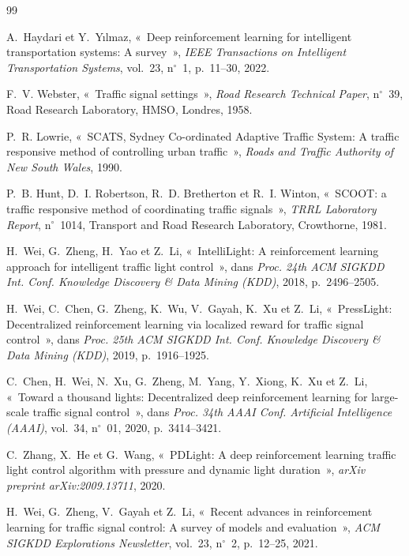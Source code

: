 \documentclass[11pt,a4paper]{article}
\begin{document}
\begin{thebibliography}{99}
\setlength{\itemsep}{0.25em}

A.~Haydari et Y.~Y{\i}lmaz, «~Deep reinforcement learning for intelligent transportation systems: A survey~», \emph{IEEE Transactions on Intelligent Transportation Systems}, vol.~23, n$^\circ$~1, p.~11--30, 2022.

F.~V. Webster, «~Traffic signal settings~», \emph{Road Research Technical Paper}, n$^\circ$~39, Road Research Laboratory, HMSO, Londres, 1958.

P.~R. Lowrie, «~SCATS, Sydney Co-ordinated Adaptive Traffic System: A traffic responsive method of controlling urban traffic~», \emph{Roads and Traffic Authority of New South Wales}, 1990.

P.~B. Hunt, D.~I. Robertson, R.~D. Bretherton et R.~I. Winton, «~SCOOT: a traffic responsive method of coordinating traffic signals~», \emph{TRRL Laboratory Report}, n$^\circ$~1014, Transport and Road Research Laboratory, Crowthorne, 1981.

H.~Wei, G.~Zheng, H.~Yao et Z.~Li, «~IntelliLight: A reinforcement learning approach for intelligent traffic light control~», dans \emph{Proc. 24th ACM SIGKDD Int. Conf. Knowledge Discovery \& Data Mining (KDD)}, 2018, p.~2496--2505.

H.~Wei, C.~Chen, G.~Zheng, K.~Wu, V.~Gayah, K.~Xu et Z.~Li, «~PressLight: Decentralized reinforcement learning via localized reward for traffic signal control~», dans \emph{Proc. 25th ACM SIGKDD Int. Conf. Knowledge Discovery \& Data Mining (KDD)}, 2019, p.~1916--1925.

C.~Chen, H.~Wei, N.~Xu, G.~Zheng, M.~Yang, Y.~Xiong, K.~Xu et Z.~Li, «~Toward a thousand lights: Decentralized deep reinforcement learning for large-scale traffic signal control~», dans \emph{Proc. 34th AAAI Conf. Artificial Intelligence (AAAI)}, vol.~34, n$^\circ$~01, 2020, p.~3414--3421.

C.~Zhang, X.~He et G.~Wang, «~PDLight: A deep reinforcement learning traffic light control algorithm with pressure and dynamic light duration~», \emph{arXiv preprint arXiv:2009.13711}, 2020.

H.~Wei, G.~Zheng, V.~Gayah et Z.~Li, «~Recent advances in reinforcement learning for traffic signal control: A survey of models and evaluation~», \emph{ACM SIGKDD Explorations Newsletter}, vol.~23, n$^\circ$~2, p.~12--25, 2021.


\end{thebibliography}
\end{document}
